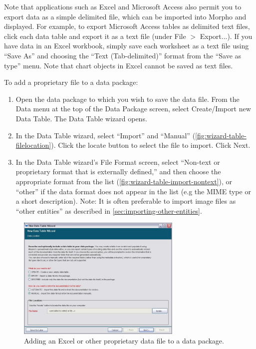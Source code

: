 Note that applications such as Excel and Microsoft Access also permit
you to export data as a simple delimited file, which can be imported
into Morpho and displayed. For example, to export Microsoft Access
tables as delimited text files, click each data table and export it as a
text file (under File $>$ Export...). If you have data in an Excel
workbook, simply save each worksheet as a text file using ``Save As''
and choosing the ``Text (Tab-delimited)'' format from the ``Save as
type'' menu. Note that chart objects in Excel cannot be saved as text
files. 

To add a proprietary file to a data package:
\begin{enumerate}
  \item Open the data package to which you wish to save the data file.
    From the Data menu at the top of the Data Package screen, select
    Create/Import new Data Table. The Data Table wizard opens.
  \item In the Data Table wizard, select ``Import'' and ``Manual''
    (\autoref{fig:wizard-table-filelocation}). Click the locate button
    to select the file to import. Click Next.
  \item In the Data Table wizard's File Format screen, select ``Non-text
    or proprietary format that is externally defined,'' and then choose
    the appropriate format from the list
    (\autoref{fig:wizard-table-import-nontext}), or ``other'' if the
    data format does not appear in the list (e.g the MIME type or a short
    description). 
    Note: It is often preferable to import image files as ``other entities'' 
    as described in \autoref{sec:importing-other-entities}.
\end{enumerate}

\begin{figure}
  \centering
    \includegraphics[width=0.7\textwidth]{images/wizard-table-filelocation.jpg}
  \caption{Adding an Excel or other proprietary data file to a
    data package.}
  \label{fig:wizard-table-filelocation}
\end{figure}

